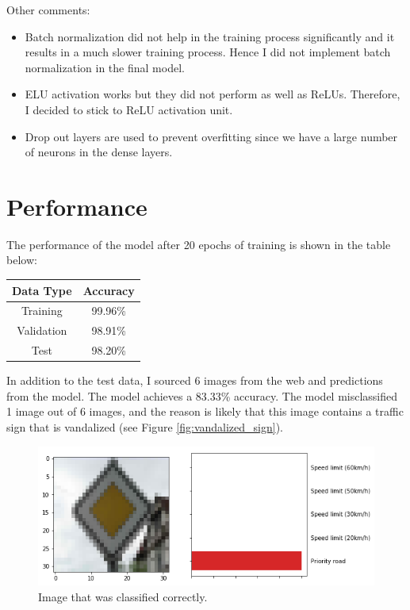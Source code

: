 \documentclass[12pt,twoside]{article}
\begin{document}
Other comments:
\begin{itemize}
	\item Batch normalization did not help in the training process significantly and it results in a much slower training process. Hence I did not implement batch normalization in the final model.
	\item ELU activation works but they did not perform as well as ReLUs. Therefore, I decided to stick to ReLU activation unit.
	\item Drop out layers are used to prevent overfitting since we have a large number of neurons in the dense layers.
\end{itemize}

\newpage

\section{Performance}
The performance of the model after 20 epochs of training is shown in the table below:
\begin{center}
\begin{tabular}{|c|c|}
\hline
Data Type 		&		Accuracy \\\hline
Training			&		99.96\%\\
Validation			&		98.91\%\\
Test					&		98.20\%\\\hline
\end{tabular}
\end{center}

In addition to the test data, I sourced 6 images from the web and predictions from the model. The model achieves a 83.33\% accuracy. The model misclassified 1 image out of 6 images, and the reason is likely that this image contains a traffic sign that is vandalized (see Figure \ref{fig:vandalized_sign}).
\begin{figure}[H]
	\begin{center}
		\includegraphics[width = 1.0\hsize]{./figures/Web1.png} 
		\caption{Image that was classified correctly.} %
		\label{fig:correct_classification} %
	\end{center}
\end{figure}
\end{document}

